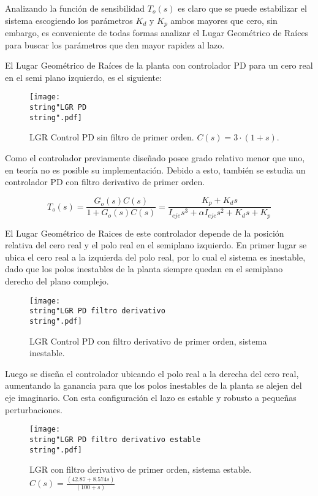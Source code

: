 \documentclass[\main/main.tex]{subfiles}
\begin{document}
Analizando la función de sensibilidad $T_{o}(s)$ es claro que se
puede estabilizar el sistema escogiendo los parámetros $K_{d}$ y
$K_{p}$ ambos mayores que cero, sin embargo, es conveniente de todas
formas analizar el Lugar Geométrico de Raíces para buscar los parámetros
que den mayor rapidez al lazo. 

El Lugar Geométrico de Raíces de la planta con controlador PD para
un cero real en el semi plano izquierdo, es el siguiente:

\begin{figure}[H]
\noindent \begin{centering}
\texttt{[image: \\string"LGR PD\\string".pdf]}
\par\end{centering}
\caption{LGR Control PD sin filtro de primer orden. $C(s)=3\cdot(1+s)$.}
\end{figure}

Como el controlador previamente diseñado posee grado relativo menor
que uno, en teoría no es posible su implementación. Debido a esto,
también se estudia un controlador PD con filtro derivativo de primer
orden. 

\[
T_{o}(s)=\frac{G_{o}(s)C(s)}{1+G_{o}(s)C(s)}=\frac{K_{p}+K_{d}s}{I_{eje}s^{3}+\alpha I_{eje}s^{2}+K_{d}s+K_{p}}
\]

El Lugar Geométrico de Raices de este controlador depende de la posición
relativa del cero real y el polo real en el semiplano izquierdo. En
primer lugar se ubica el cero real a la izquierda del polo real, por
lo cual el sistema es inestable, dado que los polos inestables de
la planta siempre quedan en el semiplano derecho del plano complejo. 

\begin{figure}[H]
\noindent \begin{centering}
\texttt{[image: \\string"LGR PD filtro derivativo\\string".pdf]}
\par\end{centering}
\caption{LGR Control PD con filtro derivativo de primer orden, sistema inestable.}
\end{figure}

Luego se diseña el controlador ubicando el polo real a la derecha
del cero real, aumentando la ganancia para que los polos inestables
de la planta se alejen del eje imaginario. Con esta configuración
el lazo es estable y robusto a pequeñas perturbaciones. 

\begin{figure}[H]
\noindent \begin{centering}
\texttt{[image: \\string"LGR PD filtro derivativo estable\\string".pdf]}
\par\end{centering}
\caption{LGR con filtro derivativo de primer orden, sistema estable. $C(s)=\frac{(42.87+8.574s)}{(100+s)}$ }
\end{figure}
\end{document}
